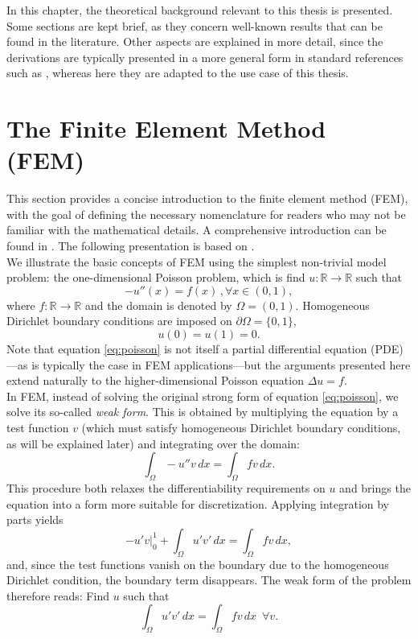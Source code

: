 In this chapter, the theoretical background relevant to this thesis is presented. Some sections are kept brief, as they concern well-known results that can be found in the literature. Other aspects are explained in more detail, since the derivations are typically presented in a more general form in standard references such as \cite{Braess_2007}, whereas here they are adapted to the use case of this thesis.\\

\section{The Finite Element Method (FEM)}
This section provides a concise introduction to the finite element method (FEM), with the goal of defining the necessary nomenclature for readers who may not be familiar with the mathematical details. A comprehensive introduction can be found in \cite{Braess_2007}. The following presentation is based on \cite{Faustmann22}.\\

We illustrate the basic concepts of FEM using the simplest non-trivial model problem: the one-dimensional Poisson problem, which is find $u:\mathbb{R}\rightarrow\mathbb{R}$ such that
\begin{equation}
    -u''(x)=f(x)\,, \forall x\in (0,1),
    \label{eq:poisson}
\end{equation}
where $f:\mathbb{R}\rightarrow\mathbb{R}$ and the domain is denoted by $\Omega = (0,1)$. Homogeneous Dirichlet boundary conditions are imposed on $\partial \Omega = \{0,1\}$,
\begin{equation}
    u(0)=u(1)=0.
\end{equation}
Note that equation \eqref{eq:poisson} is not itself a partial differential equation (PDE)—as is typically the case in FEM applications—but the arguments presented here extend naturally to the higher-dimensional Poisson equation $\Delta u = f$.\\

In FEM, instead of solving the original strong form of equation \eqref{eq:poisson}, we solve its so-called \textit{weak form}. This is obtained by multiplying the equation by a test function $v$ (which must satisfy homogeneous Dirichlet boundary conditions, as will be explained later) and integrating over the domain:
\begin{equation*}
    \int_\Omega -u''v\,dx = \int_\Omega f v\,dx.
\end{equation*}
This procedure both relaxes the differentiability requirements on $u$ and brings the equation into a form more suitable for discretization. Applying integration by parts yields
\begin{equation*}
    -u'v\Big|_0^1 + \int_\Omega u'v'\,dx = \int_\Omega f v\,dx,
\end{equation*}
and, since the test functions vanish on the boundary due to the homogeneous Dirichlet condition, the boundary term disappears. The weak form of the problem therefore reads: Find $u$ such that
\begin{equation}
    \int_\Omega u'v'\,dx = \int_\Omega f v\,dx\,\,\,\forall v.
    \label{eq:weakpoisson}
\end{equation}

